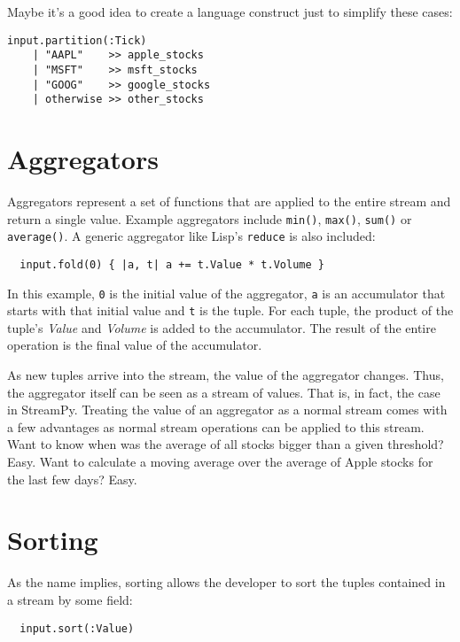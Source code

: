 \documentclass[twoside]{report}
\begin{document}
Maybe it's a good idea to create a language construct just to simplify these cases:

\begin{verbatim}
input.partition(:Tick)
    | "AAPL"    >> apple_stocks
    | "MSFT"    >> msft_stocks
    | "GOOG"    >> google_stocks
    | otherwise >> other_stocks
\end{verbatim}


\section{Aggregators}

Aggregators represent a set of functions that are applied to the entire stream and return a single value. Example aggregators include \verb=min()=, \verb=max()=, \verb=sum()= or \verb=average()=. A generic aggregator like Lisp's \verb=reduce= is also included:

\begin{verbatim}
  input.fold(0) { |a, t| a += t.Value * t.Volume }
\end{verbatim}

In this example, \verb=0= is the initial value of the aggregator, \verb=a= is an accumulator that starts with that initial value and \verb=t= is the tuple. For each tuple, the product of the tuple's \emph{Value} and \emph{Volume} is added to the accumulator. The result of the entire operation is the final value of the accumulator.

As new tuples arrive into the stream, the value of the aggregator changes. Thus, the aggregator itself can be seen as a stream of values. That is, in fact, the case in StreamPy. Treating the value of an aggregator as a normal stream comes with a few advantages as normal stream operations can be applied to this stream. Want to know when was the average of all stocks bigger than a given threshold? Easy. Want to calculate a moving average over the average of Apple stocks for the last few days? Easy.

\section{Sorting}

As the name implies, sorting allows the developer to sort the tuples contained in a stream by some field:

\begin{verbatim}
  input.sort(:Value)
\end{verbatim}
\end{document}
